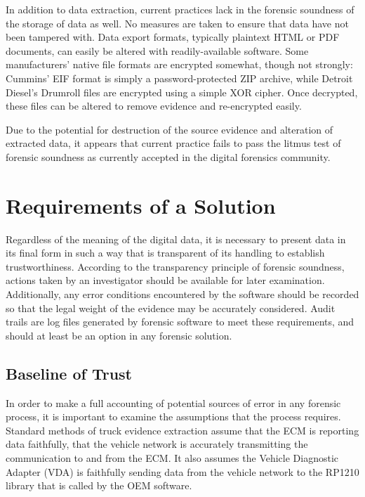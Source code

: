 In addition to data extraction, current practices lack in the forensic soundness of the storage of data as well. No measures are taken to ensure that data have not been tampered
with. Data export formats, typically plaintext HTML or PDF documents, can easily be altered with readily-available software. Some manufacturers' native file formats are encrypted
somewhat, though not strongly: Cummins' EIF format is simply a password-protected ZIP archive, while Detroit Diesel's Drumroll files are encrypted using a simple XOR cipher.
Once decrypted, these files can be altered to remove evidence and re-encrypted easily.

Due to the potential for destruction of the source evidence and alteration of extracted data, it appears that current practice fails to pass the litmus test of forensic soundness
as currently accepted in the digital forensics community.

\chapter{Requirements of a Solution}

Regardless of the meaning of the digital data, it is necessary to present data in its final form in such a way that is transparent of its handling to establish trustworthiness. 
According to the transparency principle of forensic soundness, actions taken by an investigator should be available for later examination. Additionally, any error conditions 
encountered by the software should be recorded so that the legal weight of the evidence may be accurately considered. Audit trails are log files generated by forensic software 
to meet these requirements, and should at least be an option in any forensic solution.

\section{Baseline of Trust}

In order to make a full accounting of potential sources of error in any forensic process, it is important to examine the assumptions that the process requires. Standard methods of 
truck evidence extraction assume that the ECM is reporting data faithfully, that the vehicle network is accurately transmitting the communication to and from the ECM. It also assumes 
the Vehicle Diagnostic Adapter (VDA) is faithfully sending data from the vehicle network to the RP1210 library that is called by the OEM software.

